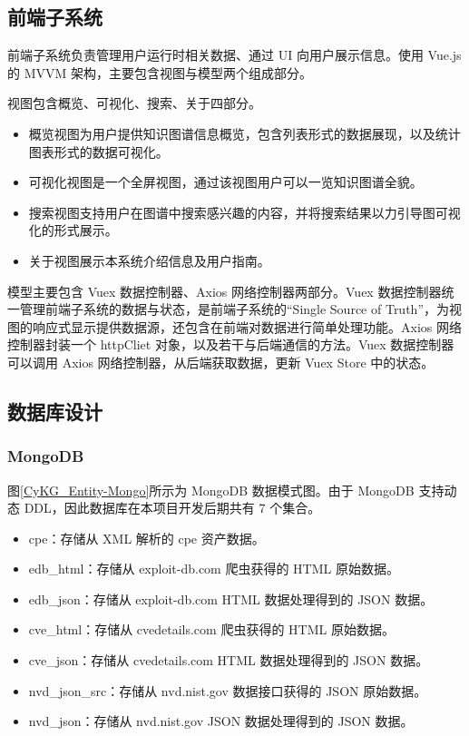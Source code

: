 \documentclass[a4paper,AutoFakeBold,oneside,12pt]{book}
\begin{document}
\subsection{前端子系统}

前端子系统负责管理用户运行时相关数据、通过 UI 向用户展示信息。使用 Vue.js 的 MVVM 架构，主要包含视图与模型两个组成部分。

视图包含概览、可视化、搜索、关于四部分。

\begin{itemize}
	\item 概览视图为用户提供知识图谱信息概览，包含列表形式的数据展现，以及统计图表形式的数据可视化。
	\item 可视化视图是一个全屏视图，通过该视图用户可以一览知识图谱全貌。
	\item 搜索视图支持用户在图谱中搜索感兴趣的内容，并将搜索结果以力引导图可视化的形式展示。
	\item 关于视图展示本系统介绍信息及用户指南。
\end{itemize}

模型主要包含 Vuex 数据控制器、Axios 网络控制器两部分。Vuex 数据控制器统一管理前端子系统的数据与状态，是前端子系统的``Single Source of Truth''，为视图的响应式显示提供数据源，还包含在前端对数据进行简单处理功能。Axios 网络控制器封装一个 httpCliet 对象，以及若干与后端通信的方法。Vuex 数据控制器可以调用 Axios 网络控制器，从后端获取数据，更新 Vuex Store 中的状态。

\subsection{数据库设计}

\subsubsection{MongoDB}

图\ref{CyKG_Entity-Mongo}所示为 MongoDB 数据模式图。由于 MongoDB 支持动态 DDL，因此数据库在本项目开发后期共有 7 个集合。
\begin{itemize}
	\item cpe：存储从 XML 解析的 cpe 资产数据。
	\item edb{\_}html：存储从 exploit-db.com 爬虫获得的 HTML 原始数据。
	\item edb{\_}json：存储从 exploit-db.com HTML 数据处理得到的 JSON 数据。
	\item cve{\_}html：存储从 cvedetails.com 爬虫获得的 HTML 原始数据。
	\item cve{\_}json：存储从 cvedetails.com HTML 数据处理得到的 JSON 数据。
	\item nvd{\_}json{\_}src：存储从 nvd.nist.gov 数据接口获得的 JSON 原始数据。
	\item nvd{\_}json：存储从 nvd.nist.gov JSON 数据处理得到的 JSON 数据。
\end{itemize}
\end{document}

